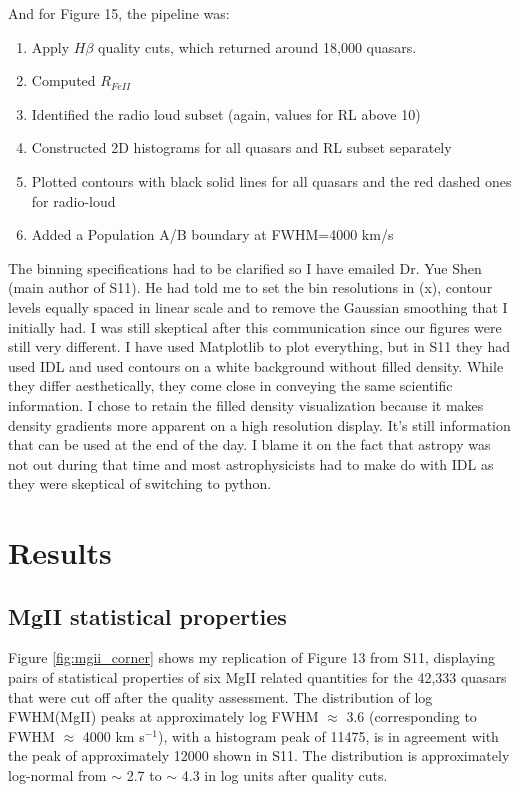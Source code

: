 \documentclass[11pt,a4paper]{article}
\begin{document}
And for Figure 15, the pipeline was:

\begin{enumerate}
    \item Apply $H \beta$ quality cuts, which returned around 18,000 quasars. 
    \item Computed $R_{FeII}$
    \item Identified the radio loud subset (again, values for RL above 10)
    \item Constructed 2D histograms for all quasars and RL subset separately 
    \item Plotted contours with black solid lines for all quasars and the red dashed ones for radio-loud
    \item Added a Population A/B boundary at FWHM=4000 km/s
\end{enumerate}

The binning specifications had to be clarified so I have emailed Dr. Yue Shen (main author of S11). He had told me to set the bin resolutions in (x), contour levels equally spaced in linear scale and to remove the Gaussian smoothing that I initially had.
I was still skeptical after this communication since our figures were still very different. I have used Matplotlib to plot everything, but in S11 they had used IDL and used contours on a white background without filled density. While they differ aesthetically, they come close in conveying the same scientific information. I chose to retain the filled density visualization because it makes density gradients more apparent on a high resolution display. It's still information that can be used at the end of the day. I blame it on the fact that astropy was not out during that time and most astrophysicists had to make do with IDL as they were skeptical of switching to python.

\section{Results}

\subsection{MgII statistical properties}
Figure \ref{fig:mgii_corner} shows my replication of Figure 13 from S11, displaying pairs of statistical properties of six MgII related quantities for the 42,333 quasars that were cut off after the quality assessment. The distribution of log FWHM(MgII) peaks at approximately log FWHM  $\approx$ 3.6 (corresponding to FWHM $\approx$ 4000 km s$^{-1}$), with a histogram peak of 11475, is in agreement with the peak of approximately 12000 shown in S11. The distribution is approximately log-normal from $\sim$ 2.7 to $\sim$ 4.3 in log units after quality cuts. 
\end{document}
